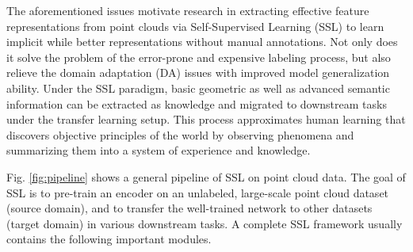 \documentclass[a4paper,fleqn]{cas-dc}
\begin{document}
The aforementioned issues motivate research in extracting effective feature representations from point clouds via Self-Supervised Learning (SSL) to learn implicit while better representations without manual annotations. Not only does it solve the problem of the error-prone and expensive labeling process, but also relieve the domain adaptation (DA) issues \citep{csurka2017domain} with improved model generalization ability. Under the SSL paradigm, basic geometric as well as advanced semantic information can be extracted as knowledge and migrated to downstream tasks under the transfer learning setup. This process approximates human learning that discovers objective principles of the world by observing phenomena and summarizing them into a system of experience and knowledge.

Fig. \ref{fig:pipeline} shows a general pipeline of SSL on point cloud data. The goal of SSL is to pre-train an encoder on an unlabeled, large-scale point cloud dataset (source domain), and to transfer the well-trained network to other datasets (target domain) in various downstream tasks. A complete SSL framework usually contains the following important modules.
\end{document}
